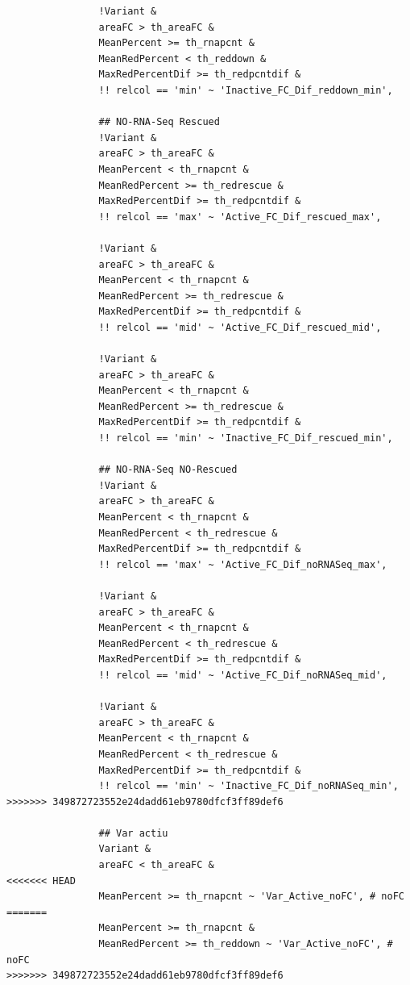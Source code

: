 \documentclass[11pt]{article}
\begin{document}
\begin{verbatim}
                !Variant &
                areaFC > th_areaFC &
                MeanPercent >= th_rnapcnt &
                MeanRedPercent < th_reddown &
                MaxRedPercentDif >= th_redpcntdif &
                !! relcol == 'min' ~ 'Inactive_FC_Dif_reddown_min',

                ## NO-RNA-Seq Rescued
                !Variant &
                areaFC > th_areaFC &
                MeanPercent < th_rnapcnt &
                MeanRedPercent >= th_redrescue &
                MaxRedPercentDif >= th_redpcntdif &
                !! relcol == 'max' ~ 'Active_FC_Dif_rescued_max',

                !Variant &
                areaFC > th_areaFC &
                MeanPercent < th_rnapcnt &
                MeanRedPercent >= th_redrescue &
                MaxRedPercentDif >= th_redpcntdif &
                !! relcol == 'mid' ~ 'Active_FC_Dif_rescued_mid',

                !Variant &
                areaFC > th_areaFC &
                MeanPercent < th_rnapcnt &
                MeanRedPercent >= th_redrescue &
                MaxRedPercentDif >= th_redpcntdif &
                !! relcol == 'min' ~ 'Inactive_FC_Dif_rescued_min',

                ## NO-RNA-Seq NO-Rescued
                !Variant &
                areaFC > th_areaFC &
                MeanPercent < th_rnapcnt &
                MeanRedPercent < th_redrescue &
                MaxRedPercentDif >= th_redpcntdif &
                !! relcol == 'max' ~ 'Active_FC_Dif_noRNASeq_max',

                !Variant &
                areaFC > th_areaFC &
                MeanPercent < th_rnapcnt &
                MeanRedPercent < th_redrescue &
                MaxRedPercentDif >= th_redpcntdif &
                !! relcol == 'mid' ~ 'Active_FC_Dif_noRNASeq_mid',

                !Variant &
                areaFC > th_areaFC &
                MeanPercent < th_rnapcnt &
                MeanRedPercent < th_redrescue &
                MaxRedPercentDif >= th_redpcntdif &
                !! relcol == 'min' ~ 'Inactive_FC_Dif_noRNASeq_min',
>>>>>>> 349872723552e24dadd61eb9780dfcf3ff89def6

                ## Var actiu
                Variant &
                areaFC < th_areaFC &
<<<<<<< HEAD
                MeanPercent >= th_rnapcnt ~ 'Var_Active_noFC', # noFC
=======
                MeanPercent >= th_rnapcnt &
                MeanRedPercent >= th_reddown ~ 'Var_Active_noFC', # noFC
>>>>>>> 349872723552e24dadd61eb9780dfcf3ff89def6


\end{verbatim}
\end{document}
